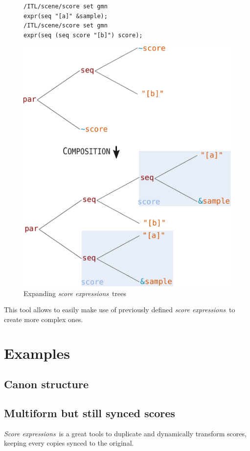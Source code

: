 \documentclass{article}
\newcommand{\oper}[1]{\textcolor{figRed}{#1}}
\newcommand{\param}[1]{\textcolor{figOrange}{#1}}
\newcommand{\prefix}[1]{\textcolor{figBlue}{#1}}
\newcommand{\sExpr}{\emph{score expressions}}
\newcommand{\SExpr}{\emph{Score expressions}}
\newcommand{\lowTilde}{\texttildelow}
\newcommand{\tab}{\hspace*{4mm}}
\newcommand{\sample}	[1]			{\vspace{-0.2em}\begin{center}\colorbox{mygrey}{\begin{minipage}[t]{0.95\columnwidth} {\small \texttt{#1}}\end{minipage}}\end{center}}
\begin{document}
\begin{figure}[th]

\sample{/ITL/scene/score set gmn\\
\tab expr(\oper{seq} \param{"[a]"} \prefix{\&}\param{sample});\\
/ITL/scene/score set gmn  \\
\tab expr(\oper{seq} (\oper{seq} \prefix{\lowTilde}\param{score} \param{"[b]"}) \prefix{\lowTilde}\param{score});
}

\centering
\includegraphics[width=0.9\columnwidth]{imgs/expandingTree}
\caption{Expanding \sExpr\ trees
\label{fig:expandingTree}}
\end{figure}

This tool allows to easily make use of previously defined \sExpr\ to create more complex ones.
\section{Examples}
\label{examples}

\subsection{Canon structure}

\subsection{Multiform but still synced scores}
\SExpr\ is a great tools to duplicate and dynamically transform scores, keeping every copies synced to the original.
\end{document}
